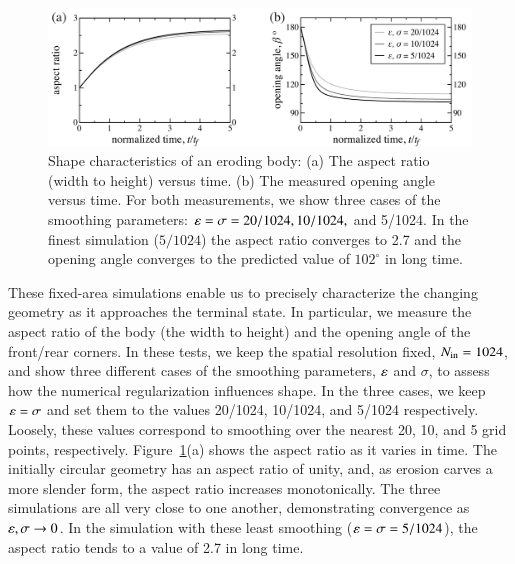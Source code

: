 \documentclass[preprint, 10pt]{elsarticle}
\begin{document}
\begin{figure}%
\begin{center}
\includegraphics[width = 0.85 \textwidth]{./figs/arangle.pdf}
\caption{Shape characteristics of an eroding body: (a) The aspect ratio (width to height) versus time. (b) The measured opening angle versus time. For both measurements, we show three cases of the smoothing parameters: $\varepsilon = \sigma = 20/1024, 10/1024,$ and 5/1024. In the finest simulation ($5/1024$) the aspect ratio converges to 2.7 and the opening angle converges to the predicted value of $102^{\circ}$ in long time.}
\label{fig:arangle}
\end{center}
\end{figure}

	These fixed-area simulations enable us to precisely characterize
        the changing geometry as it approaches the terminal state. In
        particular, we measure the aspect ratio of the body (the width
        to height) and the opening angle of the front/rear corners. In
        these tests, we keep the spatial resolution fixed, $N_{\mathrm{in}} =
        1024$, and show three different cases of the smoothing
        parameters, $\varepsilon$ and $\sigma$, to assess how the numerical
        regularization influences shape. In the three cases, we keep
        $\varepsilon = \sigma$ and set them to the values 20/1024, 10/1024, and
        5/1024 respectively. Loosely, these values correspond to
        smoothing over the nearest 20, 10, and 5 grid points, respectively. Figure~\ref{fig:arangle}(a) shows the aspect ratio as it varies in time. The initially circular geometry has an aspect ratio of unity, and, as erosion carves a more slender form, the aspect ratio increases monotonically. The three simulations are all very close to one another, demonstrating convergence as $\varepsilon, \sigma \to 0$. In the simulation with these least smoothing ($\varepsilon = \sigma = 5/1024$), the aspect ratio tends to a value of 2.7 in long time.
\end{document}
